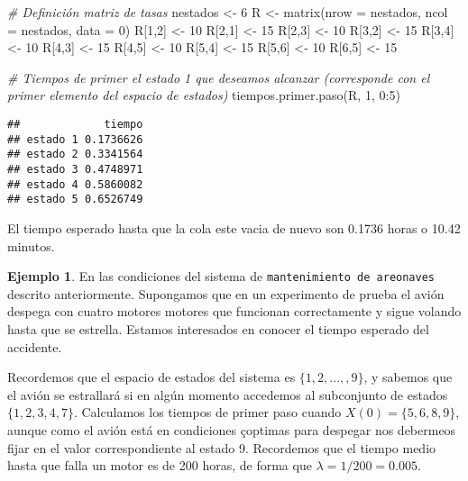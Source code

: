 \documentclass[
]{book}
\newenvironment{Shaded}{\begin{snugshade}}{\end{snugshade}}
\newcommand{\AttributeTok}[1]{\textcolor[rgb]{0.77,0.63,0.00}{#1}}
\newcommand{\CommentTok}[1]{\textcolor[rgb]{0.56,0.35,0.01}{\textit{#1}}}
\newcommand{\DecValTok}[1]{\textcolor[rgb]{0.00,0.00,0.81}{#1}}
\newcommand{\FunctionTok}[1]{\textcolor[rgb]{0.00,0.00,0.00}{#1}}
\newcommand{\NormalTok}[1]{#1}
\newcommand{\OtherTok}[1]{\textcolor[rgb]{0.56,0.35,0.01}{#1}}
\newcommand{\SpecialCharTok}[1]{\textcolor[rgb]{0.00,0.00,0.00}{#1}}
\theoremstyle{definition}
\theoremstyle{definition}
\newtheorem{example}{Ejemplo}[chapter]
\theoremstyle{definition}
\theoremstyle{definition}
\theoremstyle{remark}
\begin{document}
\begin{Shaded}
\begin{Highlighting}[]
\CommentTok{\# Definición matriz de tasas}
\NormalTok{nestados }\OtherTok{\textless{}{-}} \DecValTok{6}
\NormalTok{R }\OtherTok{\textless{}{-}} \FunctionTok{matrix}\NormalTok{(}\AttributeTok{nrow =}\NormalTok{ nestados, }\AttributeTok{ncol =}\NormalTok{ nestados, }\AttributeTok{data =} \DecValTok{0}\NormalTok{)}
\NormalTok{R[}\DecValTok{1}\NormalTok{,}\DecValTok{2}\NormalTok{] }\OtherTok{\textless{}{-}} \DecValTok{10}
\NormalTok{R[}\DecValTok{2}\NormalTok{,}\DecValTok{1}\NormalTok{] }\OtherTok{\textless{}{-}} \DecValTok{15} 
\NormalTok{R[}\DecValTok{2}\NormalTok{,}\DecValTok{3}\NormalTok{] }\OtherTok{\textless{}{-}} \DecValTok{10} 
\NormalTok{R[}\DecValTok{3}\NormalTok{,}\DecValTok{2}\NormalTok{] }\OtherTok{\textless{}{-}} \DecValTok{15} 
\NormalTok{R[}\DecValTok{3}\NormalTok{,}\DecValTok{4}\NormalTok{] }\OtherTok{\textless{}{-}} \DecValTok{10} 
\NormalTok{R[}\DecValTok{4}\NormalTok{,}\DecValTok{3}\NormalTok{] }\OtherTok{\textless{}{-}} \DecValTok{15} 
\NormalTok{R[}\DecValTok{4}\NormalTok{,}\DecValTok{5}\NormalTok{] }\OtherTok{\textless{}{-}} \DecValTok{10}
\NormalTok{R[}\DecValTok{5}\NormalTok{,}\DecValTok{4}\NormalTok{] }\OtherTok{\textless{}{-}} \DecValTok{15}
\NormalTok{R[}\DecValTok{5}\NormalTok{,}\DecValTok{6}\NormalTok{] }\OtherTok{\textless{}{-}} \DecValTok{10}
\NormalTok{R[}\DecValTok{6}\NormalTok{,}\DecValTok{5}\NormalTok{] }\OtherTok{\textless{}{-}} \DecValTok{15}

\CommentTok{\# Tiempos de primer el estado 1 que deseamos alcanzar (corresponde con el primer elemento del espacio de estados)}
\FunctionTok{tiempos.primer.paso}\NormalTok{(R, }\DecValTok{1}\NormalTok{, }\DecValTok{0}\SpecialCharTok{:}\DecValTok{5}\NormalTok{)}
\end{Highlighting}
\end{Shaded}

\begin{verbatim}
##             tiempo
## estado 1 0.1736626
## estado 2 0.3341564
## estado 3 0.4748971
## estado 4 0.5860082
## estado 5 0.6526749
\end{verbatim}

El tiempo esperado hasta que la cola este vacia de nuevo son 0.1736 horas o 10.42 minutos.

\begin{example}
En las condiciones del sistema de \texttt{mantenimiento\ de\ areonaves} descrito anteriormente. Supongamos que en un experimento de prueba el avión despega con cuatro motores motores que funcionan correctamente y sigue volando hasta que se estrella. Estamos interesados en conocer el tiempo esperado del accidente.

Recordemos que el espacio de estados del sistema es \(\{1, 2,...,,9\}\), y sabemos que el avión se estrallará si en algún momento accedemos al subconjunto de estados \(\{1, 2, 3, 4, 7\}.\) Calculamos los tiempos de primer paso cuando \(X(0) = \{5, 6, 8, 9\}\), aunque como el avión está en condiciones çoptimas para despegar nos debermeos fijar en el valor correspondiente al estado 9. Recordemos que el tiempo medio hasta que falla un motor es de 200 horas, de forma que \(\lambda = 1/200 = 0.005.\)
\end{example}
\end{document}
